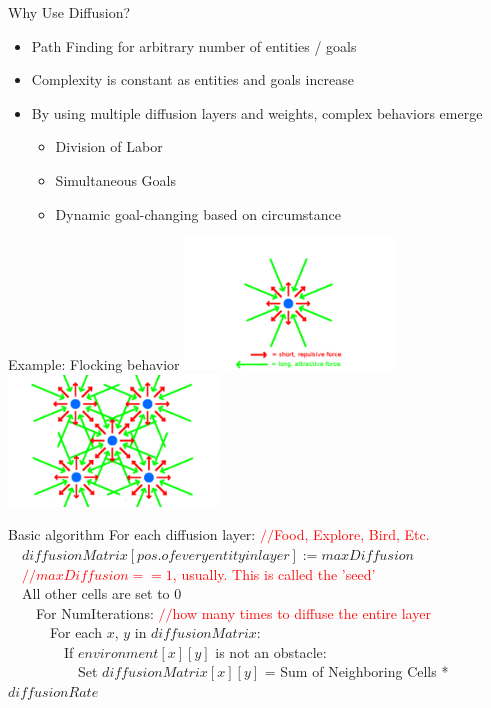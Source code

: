 \documentclass{beamer}
\begin{document}
\begin{frame}{Why Use Diffusion?}
  \begin{itemize}
  \item Path Finding for arbitrary number of entities / goals
  \item Complexity is constant as entities and goals increase
  \item By using multiple diffusion layers and weights, complex behaviors emerge
    \begin{itemize}
    \item Division of Labor
    \item Simultaneous Goals
    \item Dynamic goal-changing based on circumstance
    \end{itemize}
  \end{itemize}
\end{frame}

\begin{frame}{Example: Flocking behavior}
  \includegraphics[width=2.2in]{Bird_Forces.pdf}
  \includegraphics[width=2.2in]{Bird_Forces_Multiple.pdf}
\end{frame}

\begin{frame}{Basic algorithm}
  For each diffusion layer: \textcolor{red}{$//$Food, Explore, Bird, Etc.}\\
  \ \ $diffusionMatrix[pos. of every entity in layer] := maxDiffusion$\\
  \ \ \textcolor{red}{$//maxDiffusion == 1$, usually.  This is called the 'seed'}\\
  \ \ All other cells are set to 0\\
  \ \ \ \ For NumIterations:  \textcolor{red}{$//$how many times to diffuse the entire layer}\\
  \ \ \ \ \ \ For each $x$, $y$ in $diffusionMatrix$:\\
  \ \ \ \ \ \ \ \ If $environment[x][y]$ is not an obstacle:\\
  \ \ \ \ \ \ \ \ \ \ Set $diffusionMatrix[x][y]$ = Sum of Neighboring Cells * $diffusionRate$\\
\end{frame}
\end{document}
